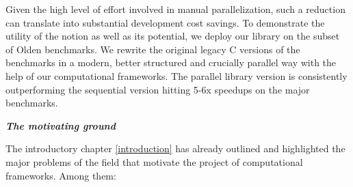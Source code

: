 Given the high level of effort involved in manual parallelization, such a reduction can translate into substantial development cost savings.\newline\null
\quad To demonstrate the utility of the notion as well as its potential, we deploy our library on the subset of Olden benchmarks. We rewrite the original legacy C versions of the benchmarks in a modern, better structured and crucially parallel way with the help of our computational frameworks. The parallel library version is consistently outperforming the sequential version hitting 5-6x speedups on the major benchmarks.
\begin{center}
\textbf{\large \textit{The motivating ground}}
\end{center}
\quad The introductory chapter \ref{introduction} has already outlined and highlighted the major problems of the field that motivate the project of computational frameworks. Among them:
